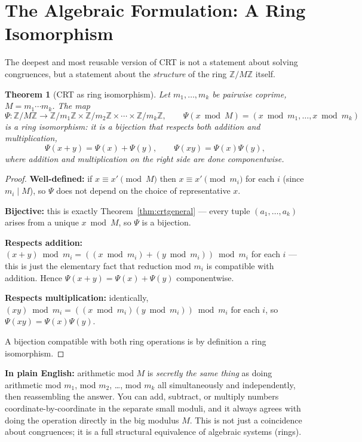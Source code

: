 \documentclass[11pt]{article}
\newtheorem{theorem}{Theorem}[section]
\theoremstyle{definition}
\theoremstyle{remark}
\newcommand{\Z}{\mathbb{Z}}
\begin{document}
\section{The Algebraic Formulation: A Ring Isomorphism}

The deepest and most reusable version of CRT is not a statement about solving congruences, but a statement about the \emph{structure} of the ring $\Z/M\Z$ itself.

\begin{theorem}[CRT as ring isomorphism]\label{thm:ring}
Let $m_1,\dots,m_k$ be pairwise coprime, $M = m_1\cdots m_k$. The map
\[
\Psi : \Z/M\Z \longrightarrow \Z/m_1\Z \times \Z/m_2\Z \times \cdots \times \Z/m_k\Z, \qquad \Psi(x \bmod M) = (x\bmod m_1, \dots, x \bmod m_k)
\]
is a ring isomorphism: it is a bijection that respects both addition and multiplication,
\[
\Psi(x+y) = \Psi(x)+\Psi(y), \qquad \Psi(xy) = \Psi(x)\Psi(y),
\]
where addition and multiplication on the right side are done componentwise.
\end{theorem}

\begin{proof}
\textbf{Well-defined:} if $x \equiv x' \pmod M$ then $x\equiv x'\pmod{m_i}$ for each $i$ (since $m_i \mid M$), so $\Psi$ does not depend on the choice of representative $x$.

\textbf{Bijective:} this is exactly Theorem~\ref{thm:crtgeneral} — every tuple $(a_1,\dots,a_k)$ arises from a unique $x \bmod M$, so $\Psi$ is a bijection.

\textbf{Respects addition:} $(x+y) \bmod m_i = ((x\bmod m_i) + (y \bmod m_i)) \bmod m_i$ for each $i$ — this is just the elementary fact that reduction mod $m_i$ is compatible with addition. Hence $\Psi(x+y) = \Psi(x)+\Psi(y)$ componentwise.

\textbf{Respects multiplication:} identically, $(xy)\bmod m_i = ((x\bmod m_i)(y\bmod m_i))\bmod m_i$ for each $i$, so $\Psi(xy) = \Psi(x)\Psi(y)$.

A bijection compatible with both ring operations is by definition a ring isomorphism.
\end{proof}

\noindent\textbf{In plain English:} arithmetic mod $M$ is \emph{secretly the same thing} as doing arithmetic mod $m_1$, mod $m_2$, \dots, mod $m_k$ all simultaneously and independently, then reassembling the answer. You can add, subtract, or multiply numbers coordinate-by-coordinate in the separate small moduli, and it always agrees with doing the operation directly in the big modulus $M$. This is not just a coincidence about congruences; it is a full structural equivalence of algebraic systems (rings).
\end{document}
